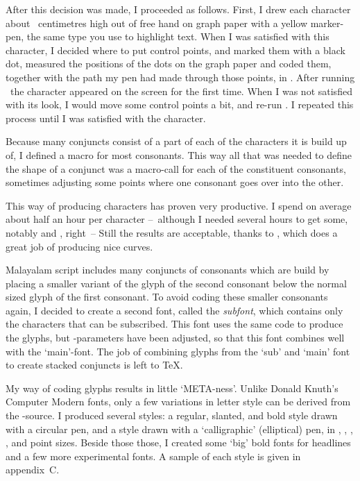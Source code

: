 After this decision was made, I proceeded as follows. First, I drew
each character about {}~centimetres high out of free hand on graph
paper with a yellow marker-pen, the same type you use to highlight
text. When I was satisfied with this character, I decided where to put
control points, and marked them with a black dot, measured the
positions of the dots on the graph paper and coded them, together with
the path my pen had made through those points, in \MF. After running
\MF\ the character appeared on the screen for the first time. When I
was not satisfied with its look, I would move some control points a
bit, and re-run \MF. I repeated this process until I was satisfied
with the character.

Because many conjuncts consist of a part of each of the characters it
is build up of, I defined a macro for most consonants. This way all
that was needed to define the shape of a conjunct was a macro-call for
each of the constituent consonants, sometimes adjusting some points
where one consonant goes over into the other.

This way of producing characters has proven very productive. I spend
on average about half an hour per character --~although I needed
several hours to get some, notably {\mm {}} and {\mm {}}, right~-- Still the
results are acceptable, thanks to \MF, which does a great job of
producing nice curves.

Malayalam script includes many conjuncts of consonants which are build
by placing a smaller variant of the glyph of the second consonant
below the normal sized glyph of the first consonant. To avoid coding
these smaller consonants again, I decided to create a second font,
called the {\it subfont\/}, which contains only the characters that
can be subscribed. This font uses the same code to produce the glyphs,
but \MF-parameters have been adjusted, so that this font combines well
with the `main'-font. The job of combining glyphs from the `sub' and
`main' font to create stacked conjuncts is left to \TeX.

My way of coding glyphs results in little `{\logo META}-ness'. Unlike
Donald Knuth's Computer Modern fonts, only a few variations in letter
style can be derived from the \MF-source. I produced several styles: a
regular, slanted, and bold style drawn with a circular pen, and a
style drawn with a `calligraphic' (elliptical) pen, in {}, {},
{}, {}, and {} point sizes. Beside those those, I
created some `big' bold fonts for headlines and a few more
experimental fonts. A sample of each style is given in appendix~C.

